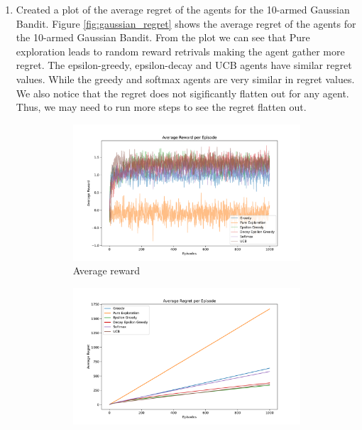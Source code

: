 \begin{enumerate}
    \item Created a plot of the average regret of the agents for the 10-armed Gaussian Bandit. Figure \ref{fig:gaussian_regret} shows the average regret of the agents for the 10-armed Gaussian Bandit. From the plot we can see that Pure exploration leads to random reward retrivals making the agent gather more regret. The epsilon-greedy, epsilon-decay and UCB agents have similar regret values. While the greedy and softmax agents are very similar in regret values. We also notice that the regret does not sigificantly flatten out for any agent. Thus, we may need to run more steps to see the regret flatten out.
    \begin{figure}[h]
        \centering
        \begin{subfigure}[b]{0.3\textwidth}
            \includegraphics[width=\textwidth]{images/mab/10_arm_gaussian_average_reward_per_episode.pdf}
            \caption{Average reward}
            \label{fig:gaussian_reward}
        \end{subfigure}
        \begin{subfigure}[b]{0.3\textwidth}
            \includegraphics[width=\textwidth]{images/mab/10_arm_gaussian_average_regret_per_episode.pdf}

\end{subfigure}
\end{figure}
\end{enumerate}
